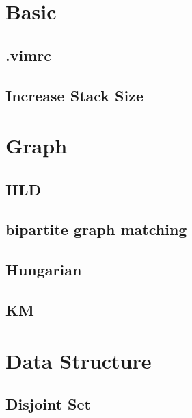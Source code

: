 \documentclass[10pt,twocolumn,oneside]{article}
\begin{document}
\newpage

\section{Basic}
\subsection{.vimrc}


\subsection{Increase Stack Size}



\section{Graph}
\subsection{HLD}

\subsection{bipartite graph matching}
\subsection{Hungarian}
\subsection{KM}

\section{Data Structure}
\subsection{Disjoint Set}

\end{document}
